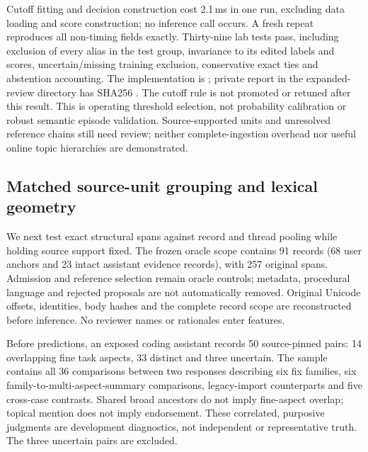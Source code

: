 \documentclass[11pt]{article}
\begin{document}
Cutoff fitting and decision construction cost 2.1\,ms in one run, excluding
data loading and score construction; no inference call occurs. A fresh repeat
reproduces all non-timing fields exactly. Thirty-nine lab tests pass, including
exclusion of every alias in the test group, invariance to its edited labels and
scores, uncertain/missing training exclusion, conservative exact ties and
abstention accounting. The implementation is
; private report
 in the expanded-review directory has SHA256
.
The cutoff rule is not promoted or retuned after this result. This is operating
threshold selection, not probability calibration or robust semantic episode
validation. Source-supported units and unresolved reference chains still need
review; neither complete-ingestion overhead nor useful online topic hierarchies
are demonstrated.

\subsection{Matched source-unit grouping and lexical geometry}
We next test exact structural spans against record and thread pooling while
holding source support fixed. The frozen oracle scope contains 91 records
(68 user anchors and 23 intact assistant evidence records), with 257 original
spans. Admission and reference selection remain oracle controls; metadata,
procedural language and rejected proposals are not automatically removed.
Original Unicode offsets, identities, body hashes and the complete record scope
are reconstructed before inference. No reviewer names or rationales enter features.

Before predictions, an exposed coding assistant records 50 source-pinned pairs:
14 overlapping fine task aspects, 33 distinct and three uncertain. The sample
contains all 36 comparisons between two responses describing six fix families,
six family-to-multi-aspect-summary comparisons, legacy-import counterparts and
five cross-case contrasts. Shared broad ancestors do not imply fine-aspect
overlap; topical mention does not imply endorsement. These correlated,
purposive judgments are development diagnostics, not independent or
representative truth. The three uncertain pairs are excluded.
\end{document}
